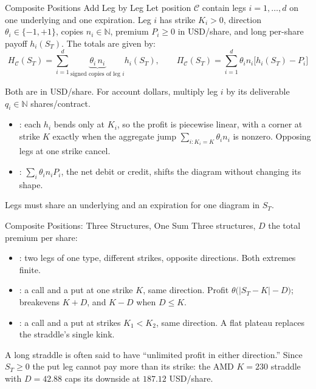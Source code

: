 \documentclass[aspectratio=169,11pt]{beamer}
\newcommand{\N}{\mathbb{N}}
\newcommand{\ST}{S_{T}}
\newcommand{\CC}{\mathcal{C}}
\newcommand{\PiC}{\Pi_{\CC}}
\newcommand{\HC}{H_{\CC}}
\begin{document}
\begin{frame}{Composite Positions Add Leg by Leg}
  Let position $\CC$ contain legs $i=1,\ldots,d$ on one underlying and one
  expiration. Leg $i$ has strike $K_i>0$, direction $\theta_i\in\{-1,+1\}$,
  copies $n_i\in\N$, premium $P_i\geq0$ in USD/share, and long per-share payoff
  $h_i(\ST)$. The  totals are given by:
  \[
    \boxed{\HC(\ST)=\sum_{i=1}^{d}\underbrace{\theta_i\,n_i}_{\text{signed copies of leg }i}h_i(\ST),
      \qquad
      \PiC(\ST)=\sum_{i=1}^{d}\theta_in_i\bigl[h_i(\ST)-P_i\bigr]}
  \]
  \vspace{-1.25em}

  Both are in USD/share. For account dollars, multiply leg $i$ by its
  deliverable $q_i\in\N$ shares/contract.
  \begin{itemize}\setlength{\itemsep}{0.2em}
    \item {}: each $h_i$ bends only at $K_i$, so
      the profit is piecewise linear, with a corner at strike $K$ exactly when
      the aggregate jump $\sum_{i:K_i=K}\theta_in_i$ is nonzero. Opposing legs
      at one strike cancel.
    \item {}: $\sum_i\theta_in_iP_i$, the
      net debit or credit, shifts the diagram without changing its shape.
  \end{itemize}
  Legs must share an underlying and an expiration for one diagram in $\ST$.
\end{frame}

\begin{frame}{Composite Positions: Three Structures, One Sum}
  Three structures, $D$ the total premium per share:
  \begin{itemize}\setlength{\itemsep}{0.02em}
    \item {}: two legs of one type, different strikes,
      opposite directions. Both extremes finite.
    \item {}: a call and a put at one strike $K$, same direction.
      Profit $\theta\bigl(\lvert\ST-K\rvert-D\bigr)$; breakevens $K+D$, and $K-D$ when $D\leq K$.
    \item {}: a call and a put at strikes $K_1<K_2$, same
      direction. A flat plateau replaces the straddle's single kink.
  \end{itemize}
  \vspace{-0.35em}
  \textbf{} A long straddle is often said to have
  ``unlimited profit in either direction.'' 
  Since $\ST\geq0$ the put leg cannot pay more than its strike: the AMD $K=230$
  straddle with $D=42.88$ caps its downside at $187.12$ USD/share.
\end{frame}
\end{document}
